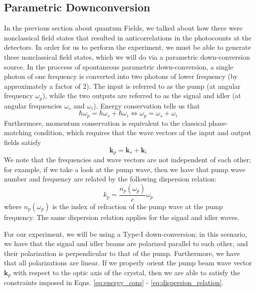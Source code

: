 \documentclass[twocolumn,amsmath,amssymb,pra]{revtex4-2}
\begin{document}
\subsection{Parametric Downconversion}
In the previous section about quantum Fields, we talked about how there were nonclassical field states that resulted in anticorrelations in the photocounts at the detectors. In order for us to perform the experiment, we must be able to generate these nonclassical field states, which we will do via a parametric down-conversion source. In the proccess of spontaneous parametric down-conversion, a single photon of one frequency is converted into two photons of lower frequency (by approximately a factor of 2). The input is referred to as the pump (at angular frequency $\omega_{p}$), while the two outputs are referred to as the signal and idler (at angular frequencies $\omega_{s}$ and $\omega_{i}$). Energy conservation tells us that 
\begin{equation}
    \hbar \omega_{p}
    =
    \hbar \omega_{s} + \hbar \omega_{i}
    \iff 
    \omega_{p}
    =
    \omega_{s} + \omega_{i}
    \label{eq:energy_cons}
\end{equation}
Furthermore, momentum conservation is equivalent to the classical phase-matching condition, which requires that the wave vectors of the input and output fields satisfy 
\begin{equation}
    \textbf{k}_{p}
    =
    \textbf{k}_{s} + \textbf{k}_{i}
    \label{eq:momentum_cons}
\end{equation}
We note that the frequencies and wave vectors are not independent of each other; for example, if we take a look at the pump wave, then we have that pump wave number and frequency are related by the following dispersion relation: 
\begin{equation}
    k_{p}
    =
    \frac{n_{p} (\omega_{p})}{c} \omega_{p}
    \label{eq:dispersion_relation}
\end{equation}
where $n_{p} (\omega_{p})$ is the index of refraction of the pump wave at the pump frequency. The same dispersion relation applies for the signal and idler waves. 

For our experiment, we will be using a Type-I down-conversion; in this scenario, we have that the signal and idler beams are polarized parallel to each other, and their polarization is perpendicular to that of the pump. Furthermore, we have that all polarizations are linear. If we properly orient the pump beam wave vector $\textbf{k}_{p}$ with respect to the optic axis of the crystal, then we are able to satisfy the constraints imposed in Eqns. \ref{eq:energy_cons} - \ref{eq:dispersion_relation}. 
\end{document}
